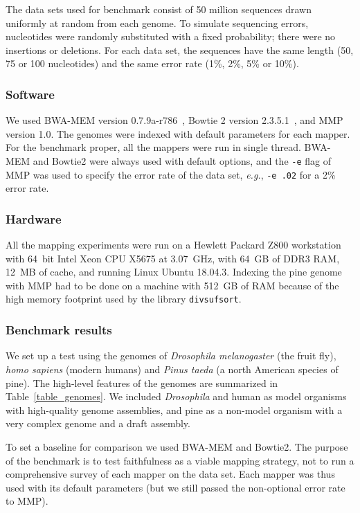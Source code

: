 \documentclass[a4,center,fleqn]{NAR}
\begin{document}
The data sets used for benchmark consist of 50 million sequences drawn
uniformly at random from each genome. To simulate sequencing errors,
nucleotides were randomly substituted with a fixed probability; there were
no insertions or deletions. For each data set, the sequences have the same
length (50, 75 or 100 nucleotides) and the same error rate (1\%, 2\%, 5\%
or 10\%).

\subsubsection{Software}

We used BWA-MEM version 0.7.9a-r786~\cite{li2013aligning}, Bowtie 2
version 2.3.5.1~\cite{pmid22388286}, and MMP version 1.0. The genomes were
indexed with default parameters for each mapper. For the benchmark proper,
all the mappers were run in single thread. BWA-MEM and Bowtie2 were always
used with default options, and the \texttt{-e} flag of MMP was used to
specify the error rate of the data set, \textit{e.g.}, \texttt{-e .02} for
a 2\% error rate.

\subsubsection{Hardware}

All the mapping experiments were run on a Hewlett Packard Z800 workstation
with 64~bit Intel Xeon CPU X5675 at 3.07~GHz, with 64~GB of DDR3 RAM,
12~MB of cache, and running Linux Ubuntu 18.04.3. Indexing the pine genome
with MMP had to be done on a machine with 512~GB of RAM because of the
high memory footprint used by the library \texttt{divsufsort}.

\subsubsection{Benchmark results}
We set up a test using the genomes of \textit{Drosophila melanogaster}
(the fruit fly), \textit{homo sapiens} (modern humans) and \textit{Pinus
taeda} (a north American species of pine). The high-level features of the
genomes are summarized in Table~\ref{table_genomes}. We included
\textit{Drosophila} and human as model organisms with high-quality genome
assemblies, and pine as a non-model organism with a very complex genome
and a draft assembly.

To set a baseline for comparison we used BWA-MEM and Bowtie2. The purpose
of the benchmark is to test faithfulness as a viable mapping strategy, not
to run a comprehensive survey of each mapper on the data set. Each mapper
was thus used with its default parameters (but we still passed the
non-optional error rate to MMP).
\end{document}
